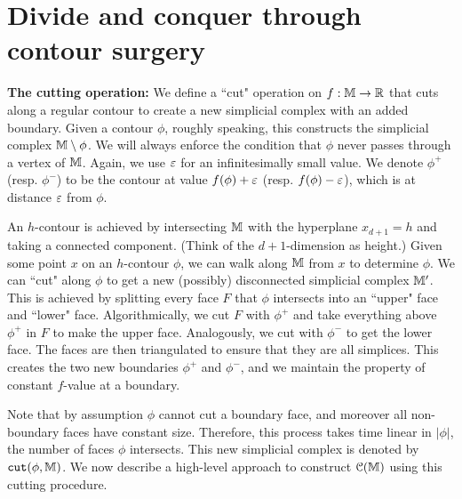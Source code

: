 \section{Divide and conquer through contour surgery} \label{sec:surgery}

{\bf The cutting operation:} We define a ``cut" operation on $f:\mathbb{M} \rightarrow \mathbb{R}$ that cuts along a regular contour to create
a new simplicial complex with an added boundary. Given a contour $\phi$, roughly speaking, this constructs the simplicial complex $\mathbb{M} \setminus \phi$. 
We will always enforce the condition that $\phi$ never passes through a vertex of $\mathbb{M}$.
Again, we use $\varepsilon$ for an infinitesimally small value. We denote $\phi^+$ (resp. $\phi^-$) to be
the contour at value $f(\phi) + \varepsilon$ (resp. $f(\phi) - \varepsilon$), which is at distance $\varepsilon$
from $\phi$. 

An $h$-contour is achieved by intersecting $\mathbb{M}$ with the hyperplane $x_{d+1} = h$ and taking a connected component. (Think of the $d+1$-dimension
as height.) Given some point $x$ on an $h$-contour $\phi$, we can walk along $\mathbb{M}$ from $x$ to determine $\phi$.
We can ``cut" along $\phi$ to get a new (possibly) disconnected simplicial complex $\mathbb{M}'$. This is achieved
by splitting every face $F$ that $\phi$ intersects into an ``upper" face and ``lower" face. Algorithmically,
we cut $F$ with $\phi^+$ and take everything above $\phi^+$ in $F$ to make the upper face. Analogously, we cut with $\phi^-$ to get the lower face.
The faces are then triangulated to ensure that they are all simplices. 
This creates the two new boundaries $\phi^+$ and $\phi^-$, and we maintain the property of constant $f$-value at a boundary.

Note that by assumption $\phi$ cannot cut a boundary face, and moreover all non-boundary faces
have constant size. Therefore, this process takes time linear in $|\phi|$, the number of faces $\phi$ intersects.
This new simplicial complex is denoted by ${\tt cut}(\phi,\mathbb{M})$.
%
We now describe a high-level approach to construct ${\cal C}(\mathbb{M})$ using this cutting procedure.


